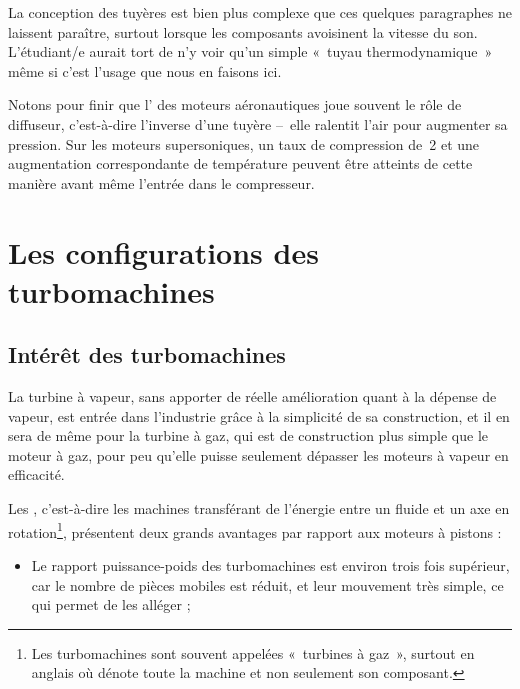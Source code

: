 		La conception des tuyères est bien plus complexe que ces quelques paragraphes ne laissent paraître, surtout lorsque les composants avoisinent la vitesse du son. L’étudiant/e aurait tort de n’y voir qu’un simple «~tuyau thermodynamique~» même si c’est l’usage que nous en faisons ici.

		Notons pour finir que l’ des moteurs aéronautiques joue souvent le rôle de diffuseur, c’est-à-dire l’inverse d’une tuyère --\ elle ralentit l’air pour augmenter sa pression. Sur les moteurs supersoniques, un taux de compression de~2 et une augmentation correspondante de température peuvent être atteints de cette manière avant même l’entrée dans le compresseur.

\onlyframabook{\needspace{4cm}}%
\section{Les configurations des turbomachines}
\label{ch_configurations_turbomachines}


	\subsection{Intérêt des turbomachines}

			La turbine à vapeur, sans apporter de réelle amélioration quant à la dépense de vapeur, est entrée dans l’industrie grâce à la simplicité de sa construction, et il en sera de même pour la turbine à gaz, qui est de construction plus simple que le moteur à gaz, pour peu qu’elle puisse seulement dépasser les moteurs à vapeur en efficacité.

		Les , c’est-à-dire les machines transférant de l’énergie entre un fluide et un axe en rotation\footnote{Les turbomachines sont souvent appelées «~turbines à gaz~», surtout en anglais où  dénote toute la machine et non seulement son composant.}, présentent deux grands avantages par rapport aux moteurs à pistons :

		\begin{itemize}
			\item Le rapport puissance-poids des turbomachines est environ trois fois supérieur, car le nombre de pièces mobiles est réduit, et leur mouvement très simple, ce qui permet de les alléger ;
		\end{itemize} %
		
